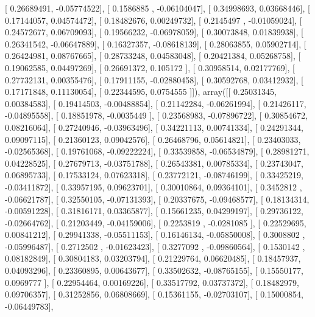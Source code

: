 \documentclass{article}
\begin{document}
       [ 0.26689491, -0.05774522],
       [ 0.1586885 , -0.06104047],
       [ 0.34998693,  0.03668446],
       [ 0.17144057,  0.04574472],
       [ 0.18482676,  0.00249732],
       [ 0.2145497 , -0.01059024],
       [ 0.24572677,  0.06709093],
       [ 0.19566232, -0.06978059],
       [ 0.30073848,  0.01839938],
       [ 0.26341542, -0.06647889],
       [ 0.16327357, -0.08618139],
       [ 0.28063855,  0.05902714],
       [ 0.26424981,  0.08767665],
       [ 0.28733248,  0.04583048],
       [ 0.20421384,  0.05268758],
       [ 0.19062585,  0.04497269],
       [ 0.26691372,  0.105172  ],
       [ 0.30958514,  0.02177769],
       [ 0.27732131,  0.00355476],
       [ 0.17911155, -0.02880458],
       [ 0.30592768,  0.03412932],
       [ 0.17171848,  0.11130054],
       [ 0.22344595,  0.0754555 ]]), array([[ 0.25031345,  0.00384583],
       [ 0.19414503, -0.00488854],
       [ 0.21142284, -0.06261994],
       [ 0.21426117, -0.04895558],
       [ 0.18851978, -0.0035449 ],
       [ 0.23568983, -0.07896722],
       [ 0.30854672,  0.08216064],
       [ 0.27240946, -0.03963496],
       [ 0.34221113,  0.00741334],
       [ 0.24291344,  0.09097115],
       [ 0.21360123,  0.09042576],
       [ 0.26468796,  0.05614821],
       [ 0.23403033, -0.02565368],
       [ 0.19761068, -0.09222224],
       [ 0.33539858, -0.06534879],
       [ 0.28981271,  0.04228525],
       [ 0.27679713, -0.03751788],
       [ 0.26543381,  0.00785334],
       [ 0.23743047,  0.06895733],
       [ 0.17533124,  0.07623318],
       [ 0.23772121, -0.08746199],
       [ 0.33425219, -0.03411872],
       [ 0.33957195,  0.09623701],
       [ 0.30010864,  0.09364101],
       [ 0.3452812 , -0.06621787],
       [ 0.32550105, -0.07131393],
       [ 0.20337675, -0.09468577],
       [ 0.18134314, -0.00591228],
       [ 0.31816171,  0.03365877],
       [ 0.15661235,  0.04299197],
       [ 0.29736122, -0.02664762],
       [ 0.21203449, -0.04159006],
       [ 0.2253819 , -0.0281085 ],
       [ 0.22529695,  0.00841212],
       [ 0.29941338, -0.05511153],
       [ 0.16146134, -0.05850008],
       [ 0.3008802 , -0.05996487],
       [ 0.2712502 , -0.01623423],
       [ 0.3277092 , -0.09860564],
       [ 0.1530142 ,  0.08182849],
       [ 0.30804183,  0.03203794],
       [ 0.21229764,  0.06620485],
       [ 0.18457937,  0.04093296],
       [ 0.23360895,  0.00643677],
       [ 0.33502632, -0.08765155],
       [ 0.15550177,  0.0969777 ],
       [ 0.22954464,  0.00169226],
       [ 0.33517792,  0.03737372],
       [ 0.18482979,  0.09706357],
       [ 0.31252856,  0.06808669],
       [ 0.15361155, -0.02703107],
       [ 0.15000854, -0.06449783],
\end{document}

